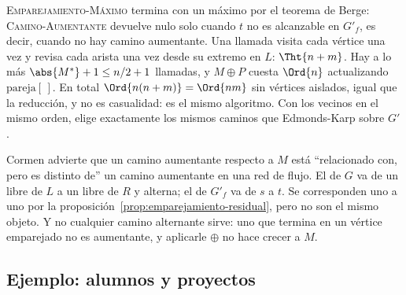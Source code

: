 \documentclass[11pt,letterpaper]{article}
\begin{document}
\textsc{Emparejamiento-Máximo} termina con un máximo por el teorema
de Berge: \textsc{Camino-Aumentante} devuelve nulo solo cuando $t$ no
es alcanzable en $G'_f$, es decir, cuando no hay camino aumentante.
Una llamada visita cada vértice una vez y revisa cada arista una vez
desde su extremo en $L$: $\Tht{n + m}$. Hay a lo más
$\abs{M^*} + 1 \le n/2 + 1$ llamadas, y $M \oplus P$ cuesta $\Ord{n}$
actualizando $\text{pareja}[\,]$. En total
$\Ord{n(n + m)} = \Ord{nm}$ sin vértices aislados, igual que la
reducción, y no es casualidad: es el mismo algoritmo. Con los vecinos
en el mismo orden, elige exactamente los mismos caminos que
Edmonds-Karp sobre $G'$.

\begin{ojo}
  Cormen advierte que un camino aumentante respecto a $M$ está
  ``relacionado con, pero es distinto de'' un camino aumentante en
  una red de flujo. El de $G$ va de un libre de $L$ a un libre de $R$
  y alterna; el de $G'_f$ va de $s$ a $t$. Se corresponden uno a uno
  por la proposición~\ref{prop:emparejamiento-residual}, pero no son el
  mismo objeto. Y no cualquier camino alternante sirve: uno que
  termina en un vértice emparejado no es aumentante, y aplicarle
  $\oplus$ no hace crecer a $M$.
\end{ojo}


\subsection*{Ejemplo: alumnos y proyectos}
\end{document}
